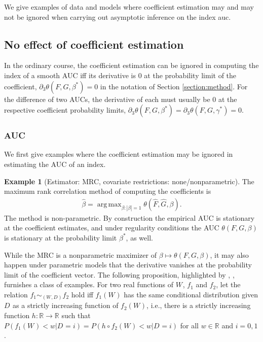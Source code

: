 \documentclass[12pt]{article}
\DeclareMathOperator*{\argmax}{arg\,max}
\newcommand{\W}[1][]{W_{#1}}
\newcommand{\D}[1][]{D_{#1}}
\renewcommand{\star}[1]{{#1}^\ast}
\newcommand{\F}{F}
\newcommand{\G}{G}
\newcommand{\auc}{\theta}
\theoremstyle{definition}
\newtheorem{example}{Example}%
\begin{document}
We give examples of data and models where coefficient estimation may
and may not be ignored when carrying out asymptotic inference on the
index auc.

\subsection{No effect of coefficient estimation}
In the ordinary course, the coefficient estimation can be ignored in
computing the index of a smooth AUC iff its derivative is 0 at the
probability limit of the coefficient,
$\partial_3\auc(F,G,\star\beta)=0$ in the notation of Section
\ref{section:method}. For the difference of two AUCs, the derivative
of each must usually be 0 at the respective coefficient probability
limits,
$\partial_3\auc(F,G,\star\beta)=\partial_3\auc(F,G,\star\gamma)=0$.

\subsubsection{AUC}\label{section:examples:auc}

We first give examples where the coefficient estimation may be ignored in estimating the AUC of an index.

\begin{example}[Estimator: MRC, covariate restrictions:
none/nonparametric]\label{example:auc:mrc} The maximum rank correlation method of computing
the coefficients is
\begin{align}
  \hat\beta = \argmax_{\beta:|\beta|=1} \auc(\hat\F,\hat\G,\beta).
\end{align}
The method is non-parametric. By construction the empirical AUC is
stationary at the coefficient estimates, and under regularity
conditions the AUC $\auc(\F,\G,\beta)$ is stationary at the probability limit $\star\beta$, as well.
\end{example}

While the MRC is a nonparametric maximizer of
$\beta\mapsto\auc(\F,\G,\beta)$, it may also happen  under parametric models that the derivative vanishes
at the probability limit of the coefficient vector. The following proposition, highlighted
by \citet{mcintosh2002}, \citet{pepe2013}, furnishes a class of
examples.  For two real functions of $\W$, $f_1$ and $f_2$, let the
relation $f_1\sim_{(\W,\D)} f_2$ hold iff $f_1(\W)$ has the same conditional
distribution given $\D$ as a strictly increasing function of
$f_2(\W)$, i.e., there is a strictly increasing function
$h:\mathbb{R}\to\mathbb{R}$ such that
$P(f_1(\W)<w|\D=i)=P(h\circ f_2(\W)<w|\D=i)$ for all $w\in\mathbb{R}$
and $i=0,1$.
\end{document}
